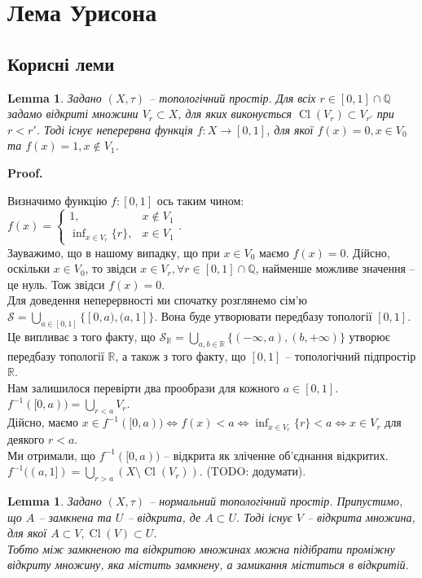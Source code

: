 \documentclass[a4paper, 10pt]{article}
\makeatletter
\theoremstyle{theoremdd}
\newtheorem{lemma}[theorem]{Lemma}
\DeclareMathOperator{\Cl}{Cl}
\renewenvironment{proof}[1][Proof.\\]{\par
\pushQED{\hfill \qed}%
\normalfont \topsep6\p@\@plus6\p@\relax
\trivlist
\item\relax
{\bfseries
#1\@addpunct{.}}\hspace\labelsep\ignorespaces
}{%
\popQED\endtrivlist\@endpefalse
}
\makeatother
\begin{document}
\section{Лема Урисона}
\subsection{Корисні леми}
\begin{lemma}
Задано $(X,\tau)$ -- топологічний простір. Для всіх $r \in [0,1] \cap \mathbb{Q}$ задамо відкриті множини $V_r \subset X$, для яких виконується $\Cl(V_r) \subset V_{r'}$ при $r < r'$. Тоді існує неперервна функція $f \colon X \to [0,1]$, для якої $f(x) = 0, x \in V_0$ та $f(x) = 1, x \notin V_1$.
\end{lemma}

\begin{proof}
Визначимо функцію $f \colon [0,1]$ ось таким чином: $f(x) = \begin{cases} 1, & x \notin V_1 \\ \inf_{x \in V_r} \{r\}, & x \in V_1 \end{cases}$. \\
Зауважимо, що в нашому випадку, що при $x \in V_0$ маємо $f(x) = 0$. Дійсно, оскільки $x \in V_0$, то звідси $x \in V_r, \forall r \in [0,1] \cap \mathbb{Q}$, найменше можливе значення -- це нуль. Тож звідси $f(x) = 0$.\\
Для доведення неперервності ми спочатку розглянемо сім'ю $\mathcal{S} = \displaystyle\bigcup_{a \in [0,1]} \{ [0,a), (a,1] \}$. Вона буде утворювати передбазу топології $[0,1]$. Це випливає з того факту, що $\mathcal{S}_{\mathbb{R}} = \displaystyle\bigcup_{a,b \in \mathbb{R}} \{(-\infty,a), (b,+\infty)\}$ утворює передбазу топології $\mathbb{R}$, а також з того факту, що $[0,1]$ -- топологічний підпростір $\mathbb{R}$.\\
Нам залишилося перевірти два прообрази для кожного $a \in [0,1]$.\\
$f^{-1}([0,a)) = \displaystyle\bigcup_{r < a} V_r$. \\
Дійсно, маємо $x \in f^{-1}([0,a)) \iff f(x) < a \iff \displaystyle\inf_{x \in V_r} \{r\} < a \iff x \in V_r$ для деякого $r < a$.\\
Ми отримали, що $f^{-1}([0,a))$ -- відкрита як зліченне об'єднання відкритих.\\
$f^{-1}((a,1]) = \displaystyle\bigcup_{r > a} (X \setminus \Cl(V_r))$. (TODO: додумати).
\end{proof}

\begin{lemma}
Задано $(X,\tau)$ -- нормальний топологічний простір. Припустимо, що $A$ -- замкнена та $U$ -- відкрита, де $A \subset U$. Тоді існує $V$ -- відкрита множина, для якої $A \subset V, \Cl(V) \subset U$.\\
Тобто між замкненою та відкритою множинах можна підібрати проміжну відкриту множину, яка містить замкнену, а замикання міститься в відкритій.
\end{lemma}
\end{document}
